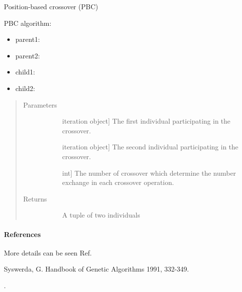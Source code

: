 \documentclass[letterpaper,10pt,english]{sphinxmanual}
\begin{document}
\begin{fulllineitems}
\label{\detokenize{pygace:pygace.ga.position_based_crossover}}
Position-based crossover (PBC)

PBC algorithm:
\begin{itemize}
\item {} 
parent1: 

\item {} 
parent2: 

\item {} 
child1: 

\item {} 
child2: 

\end{itemize}
\begin{quote}\begin{description}
\item[{Parameters}] \leavevmode\begin{description}
\item[{}] \leavevmode{[}iteration object{]}
The first individual participating in the crossover.

\item[{}] \leavevmode{[}iteration object{]}
The second individual participating in the crossover.

\item[{}] \leavevmode{[}int{]}
The number of crossover which determine the number exchange in each
crossover operation.

\end{description}

\item[{Returns}] \leavevmode\begin{description}
\item[{}] \leavevmode
A tuple of two individuals

\end{description}

\end{description}\end{quote}
\paragraph{References}

More details can be seen Ref. %
\begin{footnote}[5]\sphinxAtStartFootnote
Syswerda, G. Handbook of Genetic Algorithms 1991, 332-349.
%
\end{footnote}.

\end{fulllineitems}
\end{document}

